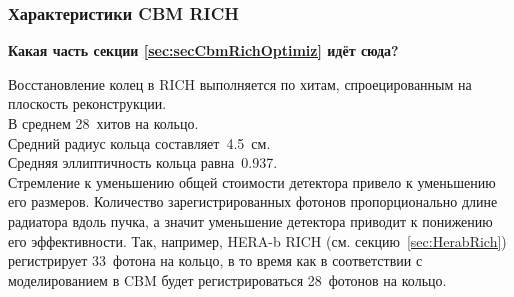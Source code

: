 


\subsubsection{Характеристики CBM RICH}\label{sec:CbmRichChar}


\textbf{Какая часть секции \ref{sec:secCbmRichOptimiz} идёт сюда?}

Восстановление колец в RICH выполняется по хитам, спроецированным на плоскость реконструкции.\\
В среднем 28~хитов на кольцо. \\
Средний радиус кольца составляет~4.5~см. \\
Средняя эллиптичность кольца равна~0.937. \\

Стремление к уменьшению общей стоимости детектора привело к уменьшению его размеров. Количество зарегистрированных фотонов пропорционально длине радиатора вдоль пучка, а значит уменьшение детектора приводит к понижению его эффективности.
Так, например, HERA-b RICH (см. секцию~\ref{sec:HerabRich}) регистрирует 33~фотона на кольцо, в то время как в соответствии с моделированием в CBM будет регистрироваться 28~фотонов на кольцо.

